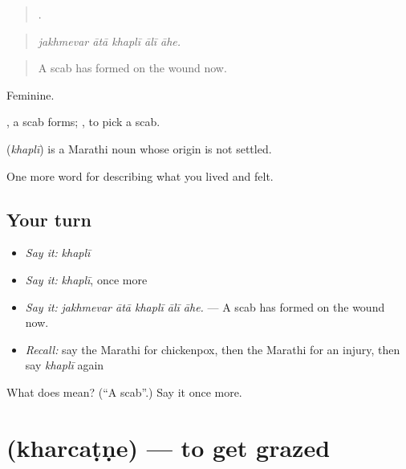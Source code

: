 \begin{quote}
    .
\end{quote}

\begin{quote}
\emph{jakhmevar ātā khaplī ālī āhe.}
\end{quote}

\begin{quote}
A scab has formed on the wound now.
\end{quote}

Feminine.

 , a scab forms;  , to pick a scab.

\begin{cousinweb}
\textbf{} (\emph{khaplī}) is a Marathi noun whose origin is not settled.
\end{cousinweb}

\begin{grammarlens}[title={What you've built}]
One more word for describing what you lived and felt.
\end{grammarlens}

\subsection*{Your turn}
\begin{itemize}
\raggedright
  \item \emph{Say it:} \emph{khaplī}
  \item \emph{Say it:} \emph{khaplī}, once more
  \item \emph{Say it:} \emph{jakhmevar ātā khaplī ālī āhe.} — A scab has formed on the wound now.
  \item \emph{Recall:} say the Marathi for chickenpox, then the Marathi for an injury, then say \emph{khaplī} again
\end{itemize}

\begin{tcolorbox}[breakable,colback=teal!4,colframe=teal!35!black,title={Before you move on}]
What does  mean? (\textquotedblleft{}A scab\textquotedblright{}.) Say it once more.
\end{tcolorbox}
\section[\texorpdfstring{\mr{खरचटणे} (kharcaṭṇe)}{खरचटणे (kharcaṭṇe)}]{ (kharcaṭṇe) — to get grazed}

